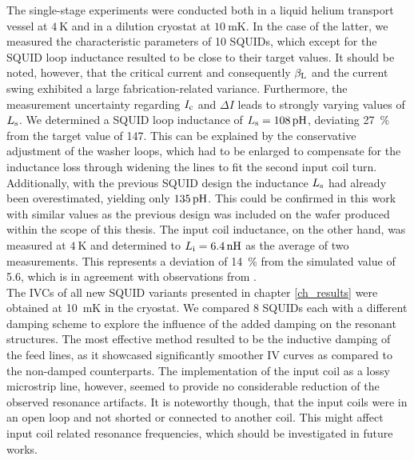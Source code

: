 The single-stage experiments were conducted both in a liquid helium transport vessel at $\qty{4}{\kelvin}$ and in a dilution cryostat at $\qty{10}{\milli\kelvin}$. In the case of the latter, we measured the characteristic parameters of 10 SQUIDs, which except for the SQUID loop inductance resulted to be close to their target values. It should be noted, however, that the critical current and consequently $\beta_{\rm L}$ and the current swing exhibited a large fabrication-related variance. Furthermore, the measurement uncertainty regarding $I_{\rm c}$ and $\Delta I$ leads to strongly varying values of $L_{\rm s}$. We determined a SQUID loop inductance of $L_{\rm s}=\qty{108}{\pH}$, deviating \qty{27}{\percent} from the target value of \qty{147}{\pH}. This can be explained by the conservative adjustment of the washer loops, which had to be enlarged to compensate for the inductance loss through widening the lines to fit the second input coil turn. Additionally, with the previous SQUID design the inductance $L_{\rm s}$ had already been overestimated, yielding only $\qty{135}{\pH}$. This could be confirmed in this work with similar values as the previous design was included on the wafer produced within the scope of this thesis. The input coil inductance, on the other hand, was measured at $\qty{4}{\kelvin}$ and determined to $L_{\rm i}=\qty{6.4}{\nH}$ as the average of two measurements. This represents a deviation of \qty{14}{\percent} from the simulated value of \qty{5.6}{\nH}, which is in agreement with observations from \cite{Ferring2015, Bauer2022}. \\

The IVCs of all new SQUID variants presented in chapter \ref{ch_results} were obtained at \qty{10}{\milli\kelvin} in the cryostat. We compared 8 SQUIDs each with a different damping scheme to explore the influence of the added damping on the resonant structures. The most effective method resulted to be the inductive damping of the feed lines, as it showcased significantly smoother IV curves as compared to the non-damped counterparts. The implementation of the input coil as a lossy microstrip line, however, seemed to provide no considerable reduction of the observed resonance artifacts. It is noteworthy though, that the input coils were in an open loop and not shorted or connected to another coil. This might affect input coil related resonance frequencies, which should be investigated in future works. \\

